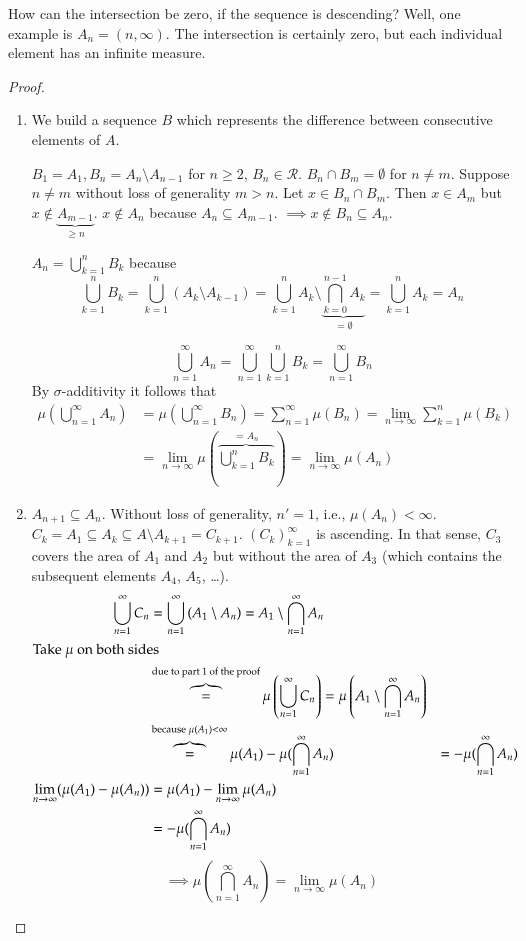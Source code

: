 \documentclass{article}
\begin{document}
How can the intersection be zero, if the sequence is descending?
Well, one example is $A_n = (n, \infty)$. The intersection is certainly zero, but each individual element has an infinite measure.

\begin{proof}
  \begin{enumerate}
    \item
      We build a sequence $B$ which represents the difference between consecutive elements of $A$.

      $B_1 = A_1, B_n = A_n \setminus A_{n-1}$ for $n \geq 2$, $B_n \in \mathcal R$.
      $B_n \cap B_m = \emptyset$ for $n \neq m$. Suppose $n \neq m$ without loss of generality $m > n$.
      Let $x \in B_n \cap B_m$. Then $x \in A_m$ but $x \not\in \underbrace{A_{m-1}}_{\geq n}$.
      $x \not\in A_n$ because $A_n \subseteq A_{m-1}$. $\implies x \not\in B_n \subseteq A_n$.

      $A_n = \bigcup_{k=1}^n B_k$ because
      \[ \bigcup_{k=1}^n B_k = \bigcup_{k=1}^n \left(A_k \setminus A_{k-1}\right) = \bigcup_{k=1}^n A_k \setminus \underbrace{\bigcap_{k=0}^{n-1} A_k}_{= \emptyset} = \bigcup_{k=1}^n A_k = A_n \]

      \[ \bigcup_{n=1}^\infty A_n = \bigcup_{n=1}^\infty \bigcup_{k=1}^n B_k = \bigcup_{n=1}^\infty B_n \]
      By $\sigma$-additivity it follows that
      \begin{align*}
        \mu\left(\bigcup_{n=1}^\infty A_n\right)
          &= \mu\left(\bigcup_{n=1}^\infty B_n\right) = \sum_{n=1}^\infty \mu(B_n) = \lim_{n\to\infty} \sum_{k=1}^n \mu(B_k) \\
          &= \lim_{n\to\infty} \mu\left(\overbrace{\bigcup_{k=1}^n B_k}^{= A_n}\right) = \lim_{n\to\infty} \mu(A_n)
      \end{align*}

    \item
      $A_{n+1} \subseteq A_n$. Without loss of generality, $n' = 1$, i.e., $\mu(A_n) < \infty$.
      $C_k = A_1 \subseteq A_k \subseteq A \setminus A_{k+1} = C_{k+1}$.
      $(C_k)^\infty_{k=1}$ is ascending.
      In that sense, $C_3$ covers the area of $A_1$ and $A_2$ but without the area of $A_3$ (which contains the subsequent elements $A_4$, $A_5$, \dots).
      \begin{align*}
        \bigcup_{n=1}^\infty C_n
            &= \bigcup_{n=1}^\infty \left(A_1 \setminus A_n\right) = A_1 \setminus \bigcap_{n=1}^\infty A_n \\
        \intertext{Take $\mu$ on both sides}
            &\overbrace{=}^{\text{due to part 1 of the proof}} \mu\left(\bigcup_{n=1}^\infty C_n\right) = \mu\left(A_1 \setminus \bigcap_{n=1}^\infty A_n\right) \\
            &\overbrace{=}^{\text{because } \mu(A_1) < \infty} \mu(A_1) - \mu(\bigcap_{n=1}^\infty A_n)
            &= - \mu(\bigcap_{n=1}^\infty A_n) \\
        \lim_{n\to\infty} (\mu(A_1) - \mu(A_n)) &= \mu(A_1) - \lim_{n\to\infty} \mu(A_n) \\
            &= -\mu(\bigcap_{n=1}^\infty A_n)
      \end{align*}
      \[ \implies \mu(\bigcap_{n=1}^\infty A_n) = \lim_{n\to\infty} \mu(A_n) \]


\end{enumerate}
\end{proof}
\end{document}
